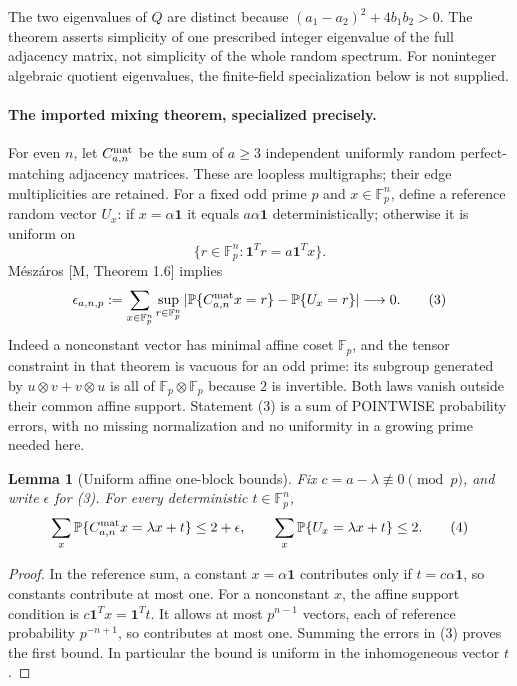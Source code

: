 \documentclass[11pt]{article}
\newtheorem{lemma}{Lemma}
\newcommand{\F}{\mathbb F}
\newcommand{\Prb}{\mathbb P}
\newcommand{\one}{\mathbf1}
\begin{document}
The two eigenvalues of $Q$ are distinct because
$(a_1-a_2)^2+4b_1b_2>0$. The theorem asserts simplicity of one prescribed
integer eigenvalue of the full adjacency matrix, not simplicity of the
whole random spectrum. For noninteger algebraic quotient eigenvalues,
the finite-field specialization below is not supplied.

\paragraph{The imported mixing theorem, specialized precisely.}
For even $n$, let $C^{\rm mat}_{a,n}$ be the sum of $a\geq3$
independent uniformly random perfect-matching adjacency matrices. These
are loopless multigraphs; their edge multiplicities are retained. For a
fixed odd prime $p$ and $x\in\F_p^n$, define a reference random vector $U_x$:
if $x=\alpha\one$ it equals $a\alpha\one$ deterministically; otherwise it
is uniform on
\[
 \{r\in\F_p^n:\one^Tr=a\one^Tx\}.
\]
M\'esz\'aros [M, Theorem 1.6] implies
\[
 \epsilon_{a,n,p}:=
 \sum_{x\in\F_p^n}\sup_{r\in\F_p^n}
 |\Prb\{C^{\rm mat}_{a,n}x=r\}-\Prb\{U_x=r\}|
 \longrightarrow0.                                      \tag{3}
\]
Indeed a nonconstant vector has minimal affine coset $\F_p$, and the
tensor constraint in that theorem is vacuous for an odd prime: its
subgroup generated by $u\otimes v+v\otimes u$ is all of
$\F_p\otimes\F_p$ because $2$ is invertible. Both laws vanish outside
their common affine support. Statement (3) is a sum of POINTWISE
probability errors, with no missing normalization and no uniformity in
a growing prime needed here.

\begin{lemma}[Uniform affine one-block bounds]
Fix $c=a-\lambda\not\equiv0\pmod p$, and write $\epsilon$ for (3).
For every deterministic $t\in\F_p^n$,
\[
 \sum_x\Prb\{C^{\rm mat}_{a,n}x=\lambda x+t\}\leq2+\epsilon,
 \qquad
 \sum_x\Prb\{U_x=\lambda x+t\}\leq2.           \tag{4}
\]
\end{lemma}
\begin{proof}
In the reference sum, a constant $x=\alpha\one$ contributes only if
$t=c\alpha\one$, so constants contribute at most one. For a nonconstant
$x$, the affine support condition is
$c\one^Tx=\one^Tt$. It allows at most $p^{n-1}$ vectors, each of
reference probability $p^{-n+1}$, so contributes at most one. Summing
the errors in (3) proves the first bound. In particular the bound is
uniform in the inhomogeneous vector $t$.
\end{proof}
\end{document}
